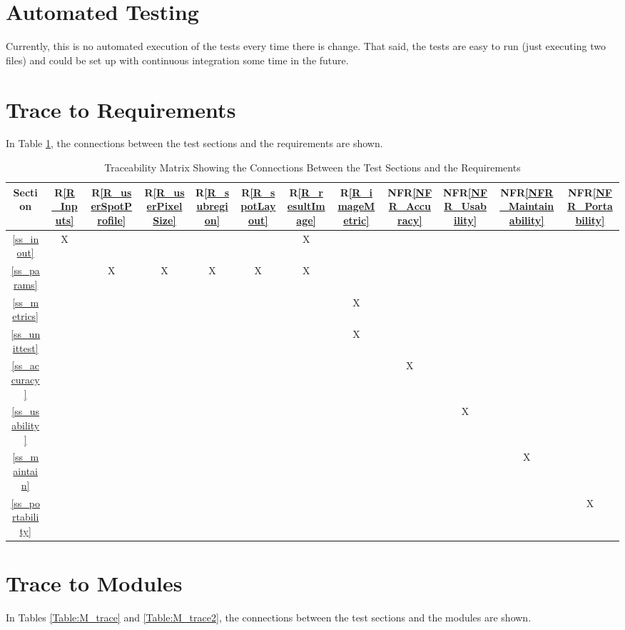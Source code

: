 \documentclass[12pt, titlepage]{article}
\newcommand{\rref}[1]{R\ref{#1}}
\newcommand{\nfrref}[1]{NFR\ref{#1}}
\begin{document}
\section{Automated Testing}
Currently, this is no automated execution of the tests every time there is change.
That said, the tests are easy to run (just executing two files) and could be set up with
continuous integration some time in the future.


\section{Trace to Requirements}
In Table \ref{Table:R_trace}, the connections between the test sections and the requirements are shown.

\begin{table}[h]
  \centering
  \begin{tabular}{|c|c|c|c|c|c|c|c|c|c|c|c|}
      \hline
      Section &
      \rref{R_Inputs} & \rref{R_userSpotProfile} & \rref{R_userPixelSize}
      & \rref{R_subregion} & \rref{R_spotLayout} & \rref{R_resultImage} &
      \rref{R_imageMetric} &
      \nfrref{NFR_Accuracy} &
      \nfrref{NFR_Usability} &
      \nfrref{NFR_Maintainability} &
      \nfrref{NFR_Portability}
      \\
      \hline
       \ref{ss_inout}        &X& & & & &X& & & & & \\ \hline
       \ref{ss_params}       & &X&X&X&X&X& & & & & \\ \hline
       \ref{ss_metrics}      & & & & & & &X& & & & \\ \hline
       \ref{ss_unittest}     & & & & & & &X& & & & \\ \hline
       \ref{ss_accuracy}     & & & & & & & &X& & & \\ \hline
       \ref{ss_usability}    & & & & & & & & &X& & \\ \hline
       \ref{ss_maintain}     & & & & & & & & & &X& \\ \hline
       \ref{ss_portability}  & & & & & & & & & & &X\\ \hline
  \end{tabular}
  \caption{Traceability Matrix Showing the Connections Between the Test Sections
    and the Requirements}
  \label{Table:R_trace}
\end{table}

\section{Trace to Modules}
In Tables \ref{Table:M_trace} and \ref{Table:M_trace2},
the connections between the test sections and the modules are shown.
\end{document}
